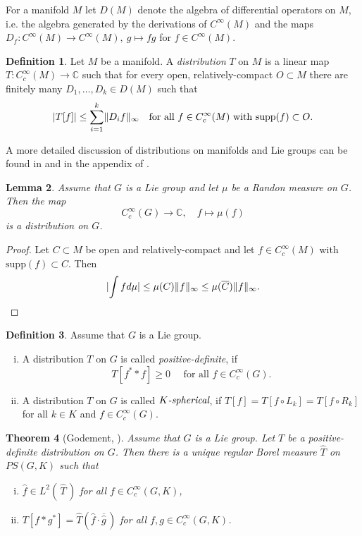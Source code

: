 \documentclass[12pt,reqno,a4paper]{amsart}
\theoremstyle{theorem}
\newtheorem{theorem}{Theorem}[section]
\newtheorem{lemma}[theorem]{Lemma}
\theoremstyle{definition}
\newtheorem{definition}[theorem]{Definition}
\numberwithin{theorem}{section}
\numberwithin{equation}{section}
\newcommand{\C}{\mathbb{C}}
\DeclarePairedDelimiter{\norm}{\lVert}{\rVert}
\DeclarePairedDelimiter{\abs}{\lvert}{\rvert}
\begin{document}
For a manifold $M$ let $D(M)$ denote the algebra of differential operators on $M$, i.e. the algebra generated by the derivations of $C^\infty(M)$ and the maps $D_f:C^\infty(M)\to C^\infty(M),\ g\mapsto fg$ for $f\in C^\infty(M)$.
\begin{definition}\label{d:distributions}
	Let $M$ be a manifold. A \emph{distribution} $T$ on $M$ is a linear map $T:C_c^\infty(M)\to \C$ such that for every open, relatively-compact $O\subset M$ there are finitely many $D_1,\dots, D_k\in D(M)$ such that
	\[\abs{T[f]}\leq \sum_{i=1}^k \norm{D_if}_\infty\quad\text{for all $f\in C_c^\infty(M)$ with $\mathrm{supp}(f)\subset O$.}\]
\end{definition}
A more detailed discussion of distributions on manifolds and Lie groups can be found in \cite{Helgason2} and in the appendix of \cite{WarnerSemmisimple1}.
\begin{lemma}\label{l:lf_measure_are_distributions}
	Assume that $G$ is a Lie group and let $\mu$ be a Randon measure on $G$. Then the map 
	\[C_c^\infty(G)\to \C,\quad f\mapsto \mu(f)\]
	is a distribution on $G$.
\end{lemma}
\begin{proof}
	Let $C\subset M$ be open and relatively-compact and let $f\in C_c^\infty(M)$ with $\mathrm{supp}(f)\subset C$. Then
	\[\abs{\int fd\mu}\leq \mu(C)\norm{f}_\infty\leq \mu(\overline{C})\norm{f}_\infty.\]
\end{proof}
\begin{definition}
	Assume that $G$ is a Lie group. 
	\begin{enumerate}[(i)]
		\item A distribution $T$ on $G$ is called \emph{positive-definite}, if 
		\[T[f^**f]\geq 0\quad\text{ for all $f\in C_c^\infty(G)$.}\]
		\item A distribution $T$ on $G$ is called $\emph{$K$-spherical}$, if
		$T[f] = T[f\circ L_k] = T[f\circ R_k]$ for all $k\in K$ and $f\in C_c^\infty(G)$.
	\end{enumerate}
\end{definition}
\begin{theorem}[Godement, \cite{Godement}]\label{t:Godement-Plancherel_for_distributions}
	Assume that $G$ is a Lie group. Let $T$ be a positive-definite distribution on $G$. Then there is a unique regular Borel measure $\widehat{T}$ on $PS(G, K)$ such that
	\begin{enumerate}[(i)]
		\item $\widehat{f}\in L^2(\hspace{2pt}\widehat{T}\hspace{2pt})$ for all $f\in C_c^\infty(G,K)$,
		\item $T[f*g^*] = \widehat{T}(\widehat{f}\cdot\overline{\widehat{g}}\hspace{2pt})$ for all $f,g\in C_c^\infty(G, K)$.
	\end{enumerate}
\end{theorem}
\end{document}
